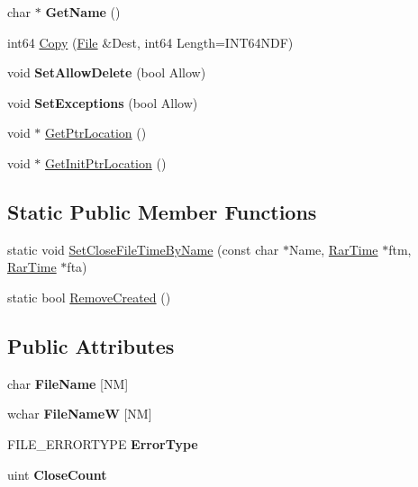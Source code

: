\begin{DoxyCompactItemize}
\item 
\hypertarget{class_file_a77e82cd2fbe4c8c40d0403210816d1f9}{char $\ast$ {\bfseries Get\-Name} ()}\label{class_file_a77e82cd2fbe4c8c40d0403210816d1f9}

\item 
int64 \hyperlink{class_file_abd01c65735015e8d685d689b69ea21fb}{Copy} (\hyperlink{class_file}{File} \&Dest, int64 Length=I\-N\-T64\-N\-D\-F)
\item 
\hypertarget{class_file_ad716b6025b44ef3fbb1fdafe92711a2e}{void {\bfseries Set\-Allow\-Delete} (bool Allow)}\label{class_file_ad716b6025b44ef3fbb1fdafe92711a2e}

\item 
\hypertarget{class_file_abba9108d19140b7db85ba8017b16cf0c}{void {\bfseries Set\-Exceptions} (bool Allow)}\label{class_file_abba9108d19140b7db85ba8017b16cf0c}

\item 
void $\ast$ \hyperlink{class_file_ac0bbba49ab8053134fd6f1bc9a7ab507}{Get\-Ptr\-Location} ()
\item 
void $\ast$ \hyperlink{class_file_adb5bafc84716b6b1fb3c3b888c989c50}{Get\-Init\-Ptr\-Location} ()
\end{DoxyCompactItemize}
\subsection*{Static Public Member Functions}
\begin{DoxyCompactItemize}
\item 
static void \hyperlink{class_file_ad134a1de0aaba47dab9452d3d6cb94e6}{Set\-Close\-File\-Time\-By\-Name} (const char $\ast$Name, \hyperlink{class_rar_time}{Rar\-Time} $\ast$ftm, \hyperlink{class_rar_time}{Rar\-Time} $\ast$fta)
\item 
static bool \hyperlink{class_file_af381e61f1e34823efc9d6bc0ee6bdb46}{Remove\-Created} ()
\end{DoxyCompactItemize}
\subsection*{Public Attributes}
\begin{DoxyCompactItemize}
\item 
\hypertarget{class_file_ab6b6fcbddc3735f0c8516ee740ed36fd}{char {\bfseries File\-Name} \mbox{[}N\-M\mbox{]}}\label{class_file_ab6b6fcbddc3735f0c8516ee740ed36fd}

\item 
\hypertarget{class_file_aeb95d0507ab830c2dbc8e0a5b27e76cf}{wchar {\bfseries File\-Name\-W} \mbox{[}N\-M\mbox{]}}\label{class_file_aeb95d0507ab830c2dbc8e0a5b27e76cf}

\item 
\hypertarget{class_file_afd0029bf9ebe722cb696349c07479872}{F\-I\-L\-E\-\_\-\-E\-R\-R\-O\-R\-T\-Y\-P\-E {\bfseries Error\-Type}}\label{class_file_afd0029bf9ebe722cb696349c07479872}

\item 
\hypertarget{class_file_a1e8fea17436d04699e12934211d9ced1}{uint {\bfseries Close\-Count}}\label{class_file_a1e8fea17436d04699e12934211d9ced1}

\end{DoxyCompactItemize}
